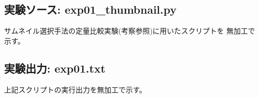 \subsection{実験ソース: exp01\_thumbnail.py}

サムネイル選択手法の定量比較実験(考察参照)に用いたスクリプトを
無加工で示す。

{\small

}

\subsection{実験出力: exp01.txt}

上記スクリプトの実行出力を無加工で示す。

{\small

}
